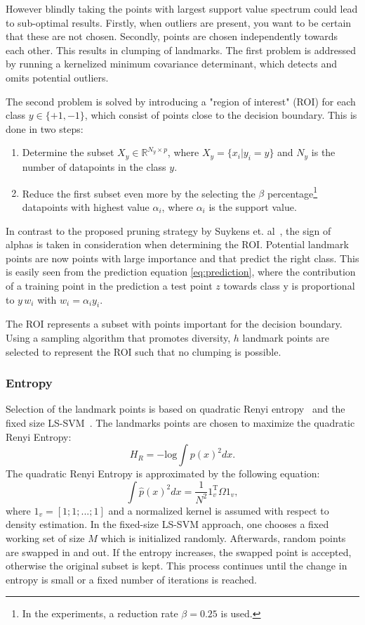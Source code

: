 \documentclass[preprint,12pt]{elsarticle}
\begin{document}
	However blindly taking the points with largest support value spectrum could lead to sub-optimal results. Firstly, when outliers are present, you want to be certain that these are not chosen. Secondly, points are chosen independently towards each other. This results in clumping of landmarks. The first problem is addressed by running a kernelized minimum covariance determinant, which detects and omits potential outliers. 
	
	The second problem is solved by introducing a "region of interest" (ROI) for each class $y \in \{+1,-1\}$, which consist of points close to the decision boundary. This is done in two steps:
	\begin{enumerate}
		\item Determine the subset 	$X_y \in \mathbb{R}^{N_y \times p}$, where $X_y = \{x_i| y_i = y\} $ and $N_y$ is the number of datapoints in the class $y$.
		\item Reduce the first subset even more by the selecting the $\beta$ percentage\footnote{In the experiments, a reduction rate $\beta = 0.25$ is used.} datapoints with highest value $\alpha_i$, where $\alpha_i$ is the support value. 
	\end{enumerate}
	In contrast to the proposed pruning strategy by Suykens et. al~\cite{suykens2000sparse}, the sign of alphas is taken in consideration when determining the ROI. Potential landmark points are now points with large importance and that predict the right class. This is easily seen from the prediction equation \eqref{eq:prediction}, where the contribution of a training point in the prediction a test point $z$ towards class y is proportional to $y \, w_i$ with $w_i = \alpha_iy_i$.
	
	The ROI represents a subset with points important for the decision boundary. Using a sampling algorithm that promotes diversity, $h$ landmark points are selected to represent the ROI such that no clumping is possible.
	
	\subsubsection{Entropy}
	Selection of the landmark points is based on quadratic Renyi entropy~\cite{girolami2002orthogonal} and the fixed size LS-SVM~\cite{suykens2002least}. The landmarks points are chosen to maximize the quadratic Renyi Entropy:
	\begin{equation}
	H_R = -\mathrm{log}\int p(x)^2 dx.
	\end{equation}
	The quadratic Renyi Entropy is approximated by the following equation\cite{girolami2002orthogonal}:
	\begin{equation}
	\int \hat{p}(x)^2dx = \frac{1}{N^2} 1_v^\mathrm{T}\Omega 1_v,
	\end{equation}
	where $1_v = [1;1;...;1]$ and a normalized kernel is assumed with respect to density estimation. In the fixed-size LS-SVM approach, one chooses a fixed working set of size $M$ which is initialized randomly. Afterwards, random points are swapped in and out. If the entropy increases, the swapped point is accepted, otherwise the original subset is kept. This process continues until the change in entropy is small or a fixed number of iterations is reached. 
	
\end{document}
